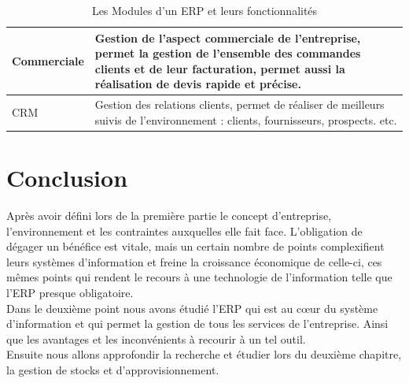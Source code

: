 \begin{table}[H]
\begin{center}
\begin{tabular}{|F{4cm}|R{10cm}|}
            \hline
            Commerciale
            &
            Gestion de l’aspect commerciale de l’entreprise, permet la gestion de l’ensemble des commandes clients et de leur facturation, permet aussi la réalisation de devis rapide et précise.\\
            
            \hline
            CRM
            &
            Gestion des relations clients, permet de réaliser de meilleurs suivis de
            l’environnement : clients, fournisseurs, prospects. etc.\\
            
            
            \hline
        \end{tabular}	
        \caption{Les Modules d'un ERP et leurs fonctionnalités}
    \end{center}
\end{table}

\section{Conclusion}
Après avoir défini lors de la première partie le concept d’entreprise, l’environnement et les contraintes auxquelles elle fait face. L’obligation de dégager un bénéfice est vitale, mais un certain nombre de points complexifient leurs systèmes d’information et freine la croissance économique de celle-ci, ces mêmes points qui rendent le recours à une technologie de l’information telle que l’ERP presque obligatoire.\\

Dans le deuxième point nous avons étudié l’ERP qui est au cœur du système d’information et qui permet la gestion de tous les services de l’entreprise. Ainsi que les avantages et les inconvénients à recourir à un tel outil.\\

Ensuite nous allons approfondir la recherche et étudier lors du deuxième chapitre, la gestion de stocks et d’approvisionnement.


\newpage

\leftskip=0cm
\renewcommand{\bibname}{Référence bibliographique et webographique du chapitre 1}
	
